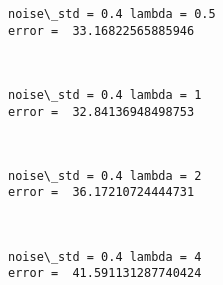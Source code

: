 \documentclass[11pt]{article}
\begin{document}
    \begin{Verbatim}[commandchars=\\\{\}]
noise\_std = 0.4 lambda = 0.5
error =  33.16822565885946

    \end{Verbatim}

    \begin{center}
    \end{center}
    { \hspace*{\fill} \\}
    
    \begin{Verbatim}[commandchars=\\\{\}]
noise\_std = 0.4 lambda = 1
error =  32.84136948498753

    \end{Verbatim}

    \begin{center}
    \end{center}
    { \hspace*{\fill} \\}
    
    \begin{Verbatim}[commandchars=\\\{\}]
noise\_std = 0.4 lambda = 2
error =  36.17210724444731

    \end{Verbatim}

    \begin{center}
    \end{center}
    { \hspace*{\fill} \\}
    
    \begin{Verbatim}[commandchars=\\\{\}]
noise\_std = 0.4 lambda = 4
error =  41.591131287740424

    \end{Verbatim}

    \begin{center}
    \end{center}
    { \hspace*{\fill} \\}
    
\end{document}
